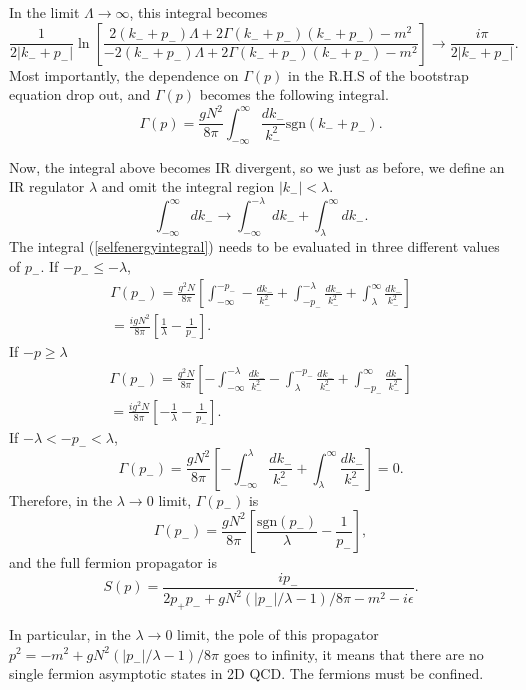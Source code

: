 \documentclass{article}
\newcommand{\bref}[1]{(\ref{#1})}
\begin{document}
In the limit $\Lambda\rightarrow\infty$, this integral becomes
\begin{equation}\label{selfenergyintegral}
	\frac{1}{2|k_{-} + p_{-}|}\ln \left[\frac{2(k_{-} + p_{-})\Lambda + 2\Gamma(k_{-} + p_{-})(k_{-}+p_{-})-m^{2}}{-2(k_{-} + p_{-})\Lambda + 2\Gamma(k_{-} + p_{-})(k_{-}+p_{-})-m^{2}}\right]\rightarrow \frac{i\pi}{2|k_{-} +p_{-}|}.
\end{equation}
Most importantly, the dependence on $\Gamma(p)$ in the R.H.S of the bootstrap equation drop out, and $\Gamma(p)$ becomes the following integral.
\[
	\Gamma(p) = \frac{gN^{2}}{8\pi}\int_{-\infty}^{\infty} \frac{dk_{-}}{k_{-}^{2}}\textrm{sgn}(k_{-}+p_{-}).
\]

Now, the integral above becomes IR divergent, so we just as before, we define an IR regulator $\lambda$ and omit the integral region $|k_{-}| < \lambda$.
\[
	\int_{-\infty}^{\infty} dk_{-}\rightarrow \int_{-\infty}^{-\lambda}dk_{-} + \int_{\lambda}^{\infty}dk_{-}.
\]
The integral \bref{selfenergyintegral} needs to be evaluated in three different values of $p_{-}$. If $-p_{-} \leq -\lambda$,
\begin{gather*}
	\Gamma(p_{-})=\frac{g^{2}N}{8\pi}\left[\int_{-\infty}^{-p_{-}}-\frac{dk_{-}}{k_{-}^{2}} + \int_{-p_{-}}^{-\lambda} \frac{dk_{-}}{k_{-}^{2}}+\int_{\lambda}^{\infty} \frac{dk_{-}}{k_{-}^2}\right]\\
	= \frac{igN^{2}}{8\pi}\left[\frac{1}{\lambda}-\frac{1}{p_{-}}\right].
\end{gather*}
If $-p \geq \lambda$
\begin{gather*}
	\Gamma(p_{-}) = \frac{g^{2}N}{8\pi}\left[-\int_{-\infty}^{-\lambda} \frac{dk_{-}}{k_{-}^{2}} -\int_{\lambda}^{-p_{-}} \frac{dk_{-}}{k_{-}^{2}}+ \int_{-p_{-}}^{\infty} \frac{dk_{-}}{k_{-}^{2}}\right] \\
	= \frac{ig^{2}N}{8\pi}\left[-\frac{1}{\lambda}-\frac{1}{p_{-}}\right].
\end{gather*}
If $-\lambda < -p_{-} < \lambda$,
\[
	\Gamma(p_{-})= \frac{gN^{2}}{8\pi}\left[-\int_{-\infty}^{\lambda} \frac{dk_{-}}{k_{-}^{2}}+ \int_{\lambda}^{\infty} \frac{dk_{-}}{k^{2}_{-}}\right]= 0.
\]
Therefore, in the $\lambda\rightarrow0$ limit, $\Gamma(p_{-})$ is
\[
	\Gamma(p_{-})= \frac{gN^{2}}{8\pi}\left[\frac{\textrm{sgn}(p_{-})}{\lambda}-\frac{1}{p_{-}}\right],
\]
and the full fermion propagator is
\[
	S(p)= \frac{ip_{-}}{2p_{+}p_{-}+gN^{2}(|p_{-}|/\lambda - 1)/8\pi -m^{2}-i\epsilon} .
\]

In particular, in the $\lambda\rightarrow 0$ limit, the pole of this propagator $p^{2} = -m^{2} + gN^{2}\left(|p_{-}|/\lambda -1 \right)/8\pi$ goes to infinity, it means that there are no single fermion asymptotic states in 2D QCD. The fermions must be confined.
\end{document}
